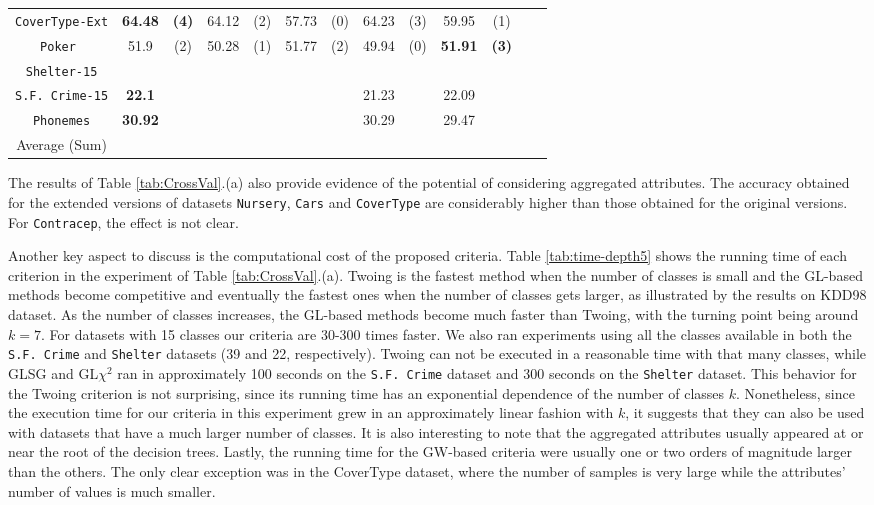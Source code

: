 \begin{table*}[t]
\begin{tabular}{c|cc|cc|cc|cc|cc|cc}
{\tt CoverType-Ext} & {\bf  64.48} & {\bf  (4)} & 64.12 & (2) & 57.73 & (0) & 64.23 & (3) & 59.95 & (1) & & \\ 
{\tt Poker }        & 51.9 & (2) &50.28 & (1) & 51.77 & (2) & 49.94 & (0) & {\bf  51.91} & {\bf  (3)} & & \\ 
{\tt Shelter-15}    &  &  &  &  &  & & &  &  & & &        \\   
{\tt S.F. Crime-15} & {\bf 22.1 } &  &  &  &  & & 21.23 &  & 22.09 & & &       \\ 
{\tt Phonemes}      & {\bf 30.92 } &  &  &  &  & & 30.29 &  & 29.47 & & &       \\
\hline
Average (Sum) &              &   &  &   & &    & &    &  &  & & 

\end{tabular}
\label{exp:thirdset}
\normalsize
\end{table*}


The results of  Table \ref{tab:CrossVal}.(a) also
provide evidence of  the potential
of considering aggregated attributes. 
The accuracy obtained for the extended versions of datasets
{\tt Nursery}, {\tt Cars} and {\tt CoverType} are considerably higher than those obtained for 
the original versions. For {\tt Contracep}, the effect is not clear.

Another key aspect to discuss is the computational cost of the
proposed criteria. Table \ref{tab:time-depth5} shows the running time of each criterion in the experiment of Table \ref{tab:CrossVal}.(a). Twoing is the fastest method when the number of classes is small and the GL-based methods become competitive and eventually the
fastest ones when the number of classes gets larger, as illustrated by the results on KDD98 dataset. As the number of classes increases, the GL-based methods become much faster than Twoing, with the turning point being around $k=7$. For datasets with 15 classes our criteria are 30-300 times faster. We also ran experiments using all the classes available in both the {\tt S.F. Crime} and {\tt Shelter} datasets (39 and 22, respectively). Twoing can not be executed in a reasonable time with that many classes, while GLSG and GL$\chi^2$ ran in approximately 100 seconds on the {\tt S.F. Crime} dataset and  300 seconds on the {\tt Shelter} dataset.  This behavior for the Twoing criterion is not surprising, since its running time has an exponential dependence of the number of classes $k$. Nonetheless, since the execution time for our criteria in this experiment grew in an approximately linear fashion with $k$, it suggests that they can also be used with datasets that have a much larger number of classes. It is also interesting to note that the aggregated attributes usually appeared at or near the root of the decision trees. Lastly, the running time for the GW-based criteria were usually one or two orders of magnitude larger than the others. The only clear exception was in the CoverType dataset, where the number of samples is very large while the attributes’ number of values is much smaller.

